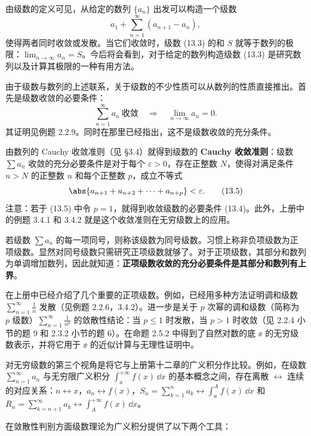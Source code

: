 由级数的定义可见，从给定的数列 $\{a_n\}$ 出发可以构造一个级数
\begin{equation}
a_1+\sum_{n=1}^{\infty}(a_{n+1}-a_n),
\tag{13.3}
\end{equation}
使得两者同时收敛或发散。当它们收敛时，级数 (13.3) 的和 $S$ 就等于数列的极限：$\lim_{n\to\infty}a_n=S$。今后将会看到，对于给定的数列构造级数 (13.3) 是研究数列以及计算其极限的一种有用方法。

由于级数与数列的上述联系，关于级数的不少性质可以从数列的性质直接推出。首先是级数收敛的必要条件：
\begin{equation}
\sum_{n=1}^{\infty}a_n\ \text{收敛}\quad\Longrightarrow\quad \lim_{n\to\infty}a_n=0.
\tag{13.4}
\end{equation}
其证明见例题 2.2.9。同时在那里已经指出，这不是级数收敛的充分条件。

由数列的 Cauchy 收敛准则（见 §3.4）就得到级数的 \textbf{Cauchy 收敛准则}：级数 $\sum a_n$ 收敛的充分必要条件是对于每个 $\varepsilon>0$，存在正整数 $N$，使得对满足条件 $n>N$ 的正整数 $n$ 和每个正整数 $p$，成立不等式
\begin{equation}
\abs{a_{n+1}+a_{n+2}+\cdots+a_{n+p}}<\varepsilon.
\tag{13.5}
\end{equation}
注意：若于 (13.5) 中令 $p=1$，就得到收敛级数的必要条件 (13.4)。此外，上册中的例题 3.4.1 和 3.4.2 就是这个收敛准则在无穷级数上的应用。

若级数 $\sum a_n$ 的每一项同号，则称该级数为同号级数。习惯上称非负项级数为正项级数。显然对同号级数只需研究正项级数就够了。对于正项级数，其部分和数列为单调增加数列，因此就知道：\textbf{正项级数收敛的充分必要条件是其部分和数列有上界}。

在上册中已经介绍了几个重要的正项级数。例如，已经用多种方法证明调和级数 $\sum_{n=1}^{\infty}\frac1n$ 发散（见例题 2.2.6，3.4.2）。进一步是关于 $p$ 次幂的调和级数（简称为 $p$ 级数）$\sum_{n=1}^{\infty}\frac1{n^p}$ 的敛散性结论：当 $p\leq1$ 时发散，当 $p>1$ 时收敛（见 2.2.4 小节的题 9 和 2.3.2 小节的题 6）。在命题 2.5.2 中得到了自然对数的底 $\ee$ 的无穷级数表示，并将它用于 $\ee$ 的近似计算与无理性证明中。

对无穷级数的第三个视角是将它与上册第十二章的广义积分作比较。例如，在级数 $\sum_{n=1}^{\infty}a_n$ 与无穷限广义积分 $\int_a^{+\infty}f(x)\,\dd x$ 的基本概念之间，存在离散 $\leftrightarrow$ 连续的对应关系：$n\leftrightarrow x$，$a_n\leftrightarrow f(x)$，$S_n=\sum_{k=1}^{n}a_k\leftrightarrow\int_a^A f(x)\,\dd x$ 和 $R_n=\sum_{k=n+1}^{\infty}a_k\leftrightarrow\int_A^{+\infty}f(x)\,\dd x$。

在敛散性判别方面级数理论为广义积分提供了以下两个工具：

